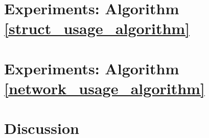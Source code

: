 \documentclass[letterpaper, 10 pt, conference]{ieeeconf}  %
\begin{document}
\section{Experiments: Algorithm \ref{struct_usage_algorithm}}

\section{Experiments: Algorithm \ref{network_usage_algorithm}}

\section{Discussion}



\end{document}
